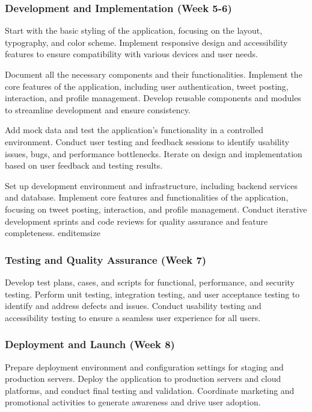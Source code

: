 \documentclass{article}
\begin{document}
\subsubsection{Development and Implementation (Week 5-6)}
    \item Start with the basic styling of the application, focusing on the layout, typography, and color scheme. Implement responsive design and accessibility features to ensure compatibility with various devices and user needs.
    \item Document all the necessary components and their functionalities. Implement the core features of the application, including user authentication, tweet posting, interaction, and profile management. Develop reusable components and modules to streamline development and ensure consistency.
    \item Add mock data and test the application's functionality in a controlled environment. Conduct user testing and feedback sessions to identify usability issues, bugs, and performance bottlenecks. Iterate on design and implementation based on user feedback and testing results.
    \item Set up development environment and infrastructure, including backend services and database. Implement core features and functionalities of the application, focusing on tweet posting, interaction, and profile management. Conduct iterative development sprints and code reviews for quality assurance and feature completeness.
end{itemsize}
\subsubsection{Testing and Quality Assurance (Week 7)}
\item Develop test plans, cases, and scripts for functional, performance, and security testing. Perform unit testing, integration testing, and user acceptance testing to identify and address defects and issues. Conduct usability testing and accessibility testing to ensure a seamless user experience for all users.
\subsubsection{Deployment and Launch (Week 8)}
\item Prepare deployment environment and configuration settings for staging and production servers. Deploy the application to production servers and cloud platforms, and conduct final testing and validation. Coordinate marketing and promotional activities to generate awareness and drive user adoption. 
\end{document}
